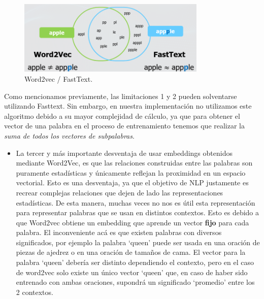 \documentclass[12pt,a4paper]{article}
\begin{document}
\begin{sloppypar}
\begin{itemize}
\begin{figure}[H]    
 \centering
 \includegraphics[width=0.8\textwidth]{images/NLP/32.png}
 \caption{Word2vec / FastText\cite{NLP_28}. }
 \label{fig:Imagen_NLP_32}
\end{figure}

\end{itemize}

Como mencionamos previamente, las limitaciones 1 y 2 pueden solventarse utilizando Fasttext. Sin embargo, en nuestra implementación no utilizamos este algoritmo debido a su mayor complejidad de cálculo, ya que para obtener el vector de una palabra en el proceso de entrenamiento tenemos que realizar la \textit{suma de todos los vectores de subpalabras}.

\begin{itemize}

\item La tercer y más importante desventaja de usar embeddings obtenidos mediante Word2Vec\cite{NLP_26}, es que las relaciones construidas entre las palabras son puramente estadísticas y únicamente reflejan la proximidad en un espacio vectorial. Esto es una desventaja, ya que el objetivo de NLP justamente es recrear complejas relaciones que dejen de lado las representaciones estadísticas. De esta manera, muchas veces no nos es útil esta representación para representar palabras que se usan en distintos contextos. Esto es debido a que Word2vec obtiene un embedding que aprende un vector \textbf{fijo} para cada palabra. El inconveniente acá es que existen palabras con diversos significados, por ejemplo la palabra ‘queen’ puede ser usada en una oración de piezas de ajedrez o en una oración de tamaños de cama. El vector para la palabra ‘queen’ debería ser distinto dependiendo el contexto, pero en el caso de word2vec solo existe un único vector ‘queen’ que, en caso de haber sido entrenado con ambas oraciones, supondrá un significado ‘promedio’ entre los 2 contextos. 

\end{itemize}


\end{sloppypar}
\end{document}
